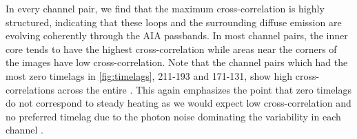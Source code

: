 In every channel pair, we find that the maximum cross-correlation is highly structured, indicating that these loops and the surrounding diffuse emission are evolving coherently through the AIA passbands. In most channel pairs, the inner core tends to have the highest cross-correlation while areas near the corners of the images have low cross-correlation. Note that the channel pairs which had the most zero timelags in \autoref{fig:timelags}, 211-193 and 171-131, show high cross-correlations across the entire \AR{}. This again emphasizes the point that zero timelags do not correspond to steady heating as we would expect low cross-correlation and no preferred timelag due to the photon noise dominating the variability in each channel \citep{viall_signatures_2016}.
